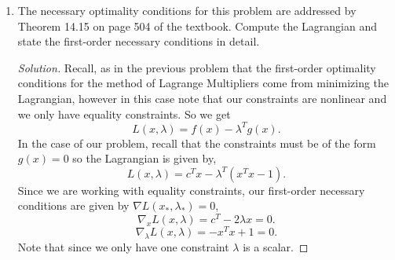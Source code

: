 \documentclass[12pt]{article}
\makeatletter
\theoremstyle{homework}
\newenvironment{exercise}[1]
{\def\@currentlabel{#1}\exercisecore}
{\endexercisecore}
\makeatother
\begin{document}
\begin{exercise}{P21}
\begin{enumerate}
    \item[(b)] The necessary optimality conditions for this problem are addressed by Theorem 14.15 on page 504 of the textbook. Compute the Lagrangian 
    and state the first-order necessary conditions in detail. 
    \begin{proof}[Solution] Recall, as in the previous problem that the first-order optimality conditions for the method of Lagrange Multipliers come from 
      minimizing the Lagrangian, however in this case note that our constraints are nonlinear and we only have equality constraints. So we get
      \begin{equation*}
        L(x, \lambda) = f(x) - \lambda^Tg(x).
      \end{equation*}
      In the case of our problem, recall that the constraints must be of the form $g(x) = 0$ so the Lagrangian is given by, 
      \begin{equation*}
        L(x, \lambda) = c^Tx - \lambda^T(x^Tx - 1).
      \end{equation*}
      Since we are working with equality constraints, our first-order necessary conditions are given by $\nabla L(x_*, \lambda_*) = 0$, 
      \begin{equation*}
        \nabla_xL(x, \lambda) = c^T - 2\lambda x = 0.
      \end{equation*}
      \begin{equation*}
        \nabla_\lambda L(x, \lambda) = -x^Tx + 1 = 0.
      \end{equation*}
      Note that since we only have one constraint $\lambda$ is a scalar. 
    \end{proof}
    \vspace{.15in}



\end{enumerate}
\end{exercise}
\end{document}
